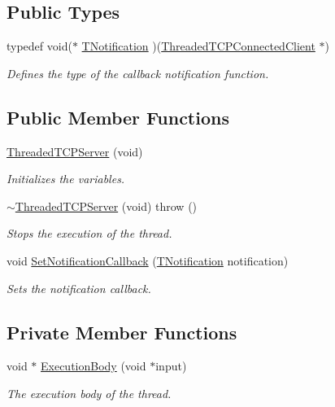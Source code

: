\subsection*{Public Types}
\begin{DoxyCompactItemize}
\item 
typedef void($\ast$ \hyperlink{class_threaded_t_c_p_server_a01f9e29f617f3452bbf1cdc33acdf905}{T\-Notification} )(\hyperlink{class_threaded_t_c_p_connected_client}{Threaded\-T\-C\-P\-Connected\-Client} $\ast$)
\begin{DoxyCompactList}\small\item\em Defines the type of the callback notification function. \end{DoxyCompactList}\end{DoxyCompactItemize}
\subsection*{Public Member Functions}
\begin{DoxyCompactItemize}
\item 
\hyperlink{class_threaded_t_c_p_server_a824edd681a2fd81d259efd22de63058d}{Threaded\-T\-C\-P\-Server} (void)
\begin{DoxyCompactList}\small\item\em Initializes the variables. \end{DoxyCompactList}\item 
\hyperlink{class_threaded_t_c_p_server_a151262ca95d024a3da46d8906bfcacfc}{$\sim$\-Threaded\-T\-C\-P\-Server} (void)  throw ()
\begin{DoxyCompactList}\small\item\em Stops the execution of the thread. \end{DoxyCompactList}\item 
void \hyperlink{class_threaded_t_c_p_server_ac201656ab22b4ad07115d78cf8b7dd89}{Set\-Notification\-Callback} (\hyperlink{class_threaded_t_c_p_server_a01f9e29f617f3452bbf1cdc33acdf905}{T\-Notification} notification)
\begin{DoxyCompactList}\small\item\em Sets the notification callback. \end{DoxyCompactList}\end{DoxyCompactItemize}
\subsection*{Private Member Functions}
\begin{DoxyCompactItemize}
\item 
void $\ast$ \hyperlink{class_threaded_t_c_p_server_a1e706ece4845443580b2e9c98f178083}{Execution\-Body} (void $\ast$input)
\begin{DoxyCompactList}\small\item\em The execution body of the thread. \end{DoxyCompactList}\end{DoxyCompactItemize}
